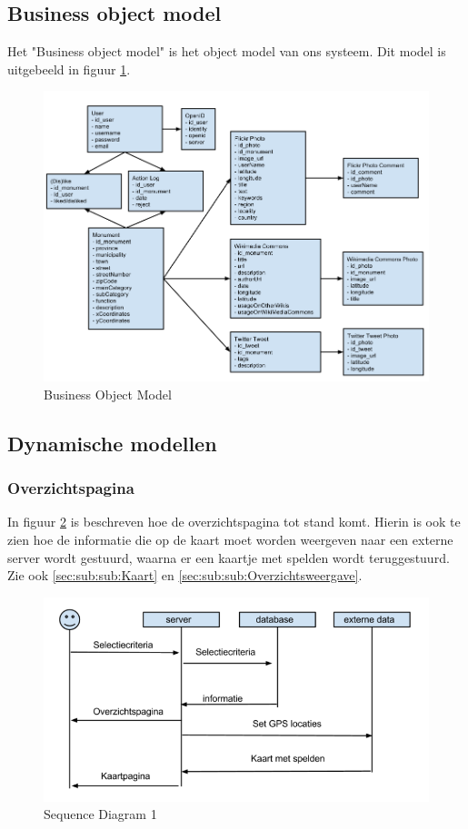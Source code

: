\documentclass[a4paper,10pt]{article}
\newcommand{\rsubsection}[1]{
\subsection{#1}\label{sec:sub:#1}
}
\newcommand{\rsubsubsection}[1]{
\subsubsection{#1}\label{sec:sub:sub:#1}
}
\begin{document}
\rsubsection{Business object model}
		Het "Business object model" is het object model van ons systeem. Dit model is uitgebeeld in figuur \ref{bom}.
		\begin{figure}[ht!]
			\centering
			\includegraphics[width=\textwidth]{BusinessObjectModel.png}
			\caption{Business Object Model \label{bom}}
		\end{figure}
		\rsubsection{Dynamische modellen}
			\rsubsubsection{Overzichtspagina}
			In figuur \ref{sequence1} is beschreven hoe de overzichtspagina tot stand komt. Hierin is ook te zien hoe de informatie die op de kaart moet worden weergeven naar een externe server wordt gestuurd, waarna er een kaartje met spelden wordt teruggestuurd. Zie ook \ref{sec:sub:sub:Kaart} en \ref{sec:sub:sub:Overzichtsweergave}.
\begin{figure}[ht!]
				\centering
				\includegraphics[width=\textwidth]{sequence1.png}
				\caption{Sequence Diagram 1 \label{sequence1}}
			\end{figure}
\end{document}

